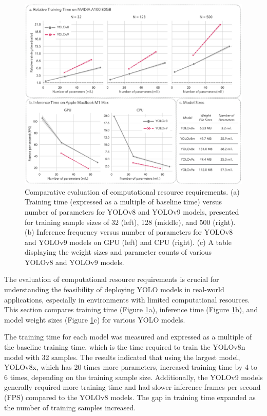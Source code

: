 \begin{figure}[h]
    \centering
    \includegraphics[width=.8\textwidth]{figure_6.jpg}
    \caption{Comparative evaluation of computational resource requirements. (a) Training time (expressed as a multiple of baseline time) versus number of parameters for YOLOv8 and YOLOv9 models, presented for training sample sizes of 32 (left), 128 (middle), and 500 (right). (b) Inference frequency versus number of parameters for YOLOv8 and YOLOv9 models on GPU (left) and CPU (right). (c) A table displaying the weight sizes and parameter counts of various YOLOv8 and YOLOv9 models.}
    \label{fig:resources}
\end{figure}

The evaluation of computational resource requirements is crucial for understanding the feasibility of deploying YOLO models in real-world applications, especially in environments with limited computational resources. This section compares training time (Figure \ref{fig:resources}a), inference time (Figure \ref{fig:resources}b), and model weight sizes (Figure \ref{fig:resources}c) for various YOLO models.

The training time for each model was measured and expressed as a multiple of the baseline training time, which is the time required to train the YOLOv8n model with 32 samples. The results indicated that using the largest model, YOLOv8x, which has 20 times more parameters, increased training time by 4 to 6 times, depending on the training sample size. Additionally, the YOLOv9 models generally required more training time and had slower inference frames per second (FPS) compared to the YOLOv8 models. The gap in training time expanded as the number of training samples increased.

